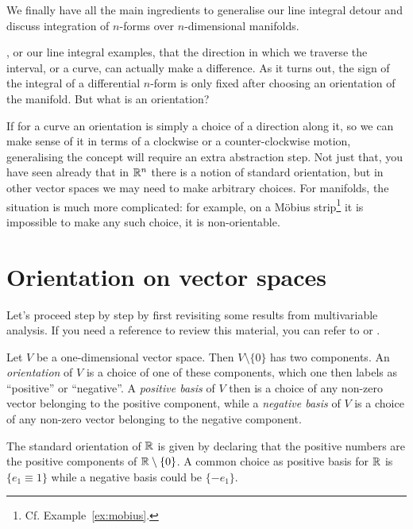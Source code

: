 We finally have all the main ingredients to generalise our line integral detour and discuss integration of $n$-forms over $n$-dimensional manifolds.

, or our line integral examples, that the direction in which we traverse the interval, or a curve, can actually make a difference.
As it turns out, the sign of the integral of a differential $n$-form is only fixed after choosing an orientation of the manifold.
But what is an orientation?

If for a curve an orientation is simply a choice of a direction along it, so we can make sense of it in terms of a clockwise or a counter-clockwise motion, generalising the concept will require an extra abstraction step.
Not just that, you have seen already that in $\mathbb{R}^n$ there is a notion of standard orientation, but in other vector spaces we may need to make arbitrary choices.
For manifolds, the situation is much more complicated: for example, on a M\"obius strip\footnote{Cf. Example~\ref{ex:mobius}.} it is impossible to make any such choice, it is non-orientable.

\section{Orientation on vector spaces}\label{sec:orientation-vs}
Let's proceed step by step by first revisiting some results from multivariable analysis. If you need a reference to review this material, you can refer to \cite[Chapter 6.2]{book:abrahammarsdenratiu} or \cite[Chapters 21.1-21.2]{book:tu}.

\begin{definition}
	Let $V$ be a one-dimensional vector space. Then $V\setminus\{0\}$ has two components.
	An \emph{orientation} of $V$ is a choice of one of these components, which one then labels as ``positive'' or ``negative''.
	A \emph{positive basis} of $V$ then is a choice of any non-zero vector belonging to the positive component, while a \emph{negative basis} of $V$ is a choice of any non-zero vector belonging to the negative component.
\end{definition}

\begin{example}
	The standard orientation of $\mathbb{R}$ is given by declaring that the positive numbers are the positive components of $\mathbb{R}\setminus\{0\}$.
	A common choice as positive basis for $\mathbb{R}$ is $\{e_1 \equiv 1\}$ while a negative basis could be $\{-e_1\}$.
\end{example}

